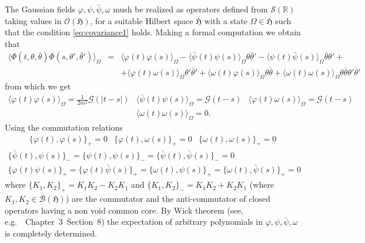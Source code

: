 \documentclass[a4paper,10pt]{article}
\begin{document}
The Gaussian fields $\varphi, \psi, \bar{\psi}, \omega$ mush be realized as
operators defined from $\mathcal{S} (\mathbb{R})$ taking values in
$\mathcal{O} (\mathfrak{H})$, for a suitable Hilbert space $\mathfrak{H}$ with
a state $\Omega \in \mathfrak{H}$ such that the condition
{\eqref{eq:covariance1}} holds. Making a formal computation we obtain that
\begin{eqnarray}
  \langle \Phi (t, \theta, \bar{\theta}) \Phi (s, \theta', \bar{\theta}')
  \rangle_{\Omega} & = & \langle \varphi (t) \varphi (s) \rangle_{\Omega} -
  \langle \bar{\psi} (t) \psi (s) \rangle_{\Omega} \theta \bar{\theta}' -
  \langle \psi (t) \bar{\psi} (s) \rangle_{\Omega} \bar{\theta} \theta' +
  \nonumber\\
  &  & + \langle \varphi (t) \omega (s) \rangle_{\Omega} \theta'
  \bar{\theta}' + \langle \omega (t) \varphi (s) \rangle_{\Omega} \theta
  \bar{\theta} + \langle \omega (t) \omega (s) \rangle_{\Omega} \theta
  \bar{\theta} \theta' \bar{\theta}' \nonumber
\end{eqnarray}
from which we get
\begin{equation}
  \begin{array}{ccc}
    \langle \varphi (t) \varphi (s) \rangle_{\Omega} = \frac{1}{2 m^2}
    \mathcal{G} (| t - s |) & \langle \bar{\psi} (t) \psi (s) \rangle_{\Omega}
    = \mathcal{G} (t - s) & \langle \varphi (t) \omega (s) \rangle_{\Omega} =
    \mathcal{G} (t - s)\\
    & \langle \omega (t) \omega (s) \rangle_{\Omega} = 0. & 
  \end{array} \label{eq:covariance2}
\end{equation}
Using the commutation relations
\begin{equation}
  \begin{array}{lcl}
    \{ \varphi (t), \varphi (s) \}_+ = 0 & \{ \varphi (t), \omega (s) \}_+ = 0
    & \{ \omega (t), \omega (s) \}_+ = 0
  \end{array} \label{eq:commutator1}
\end{equation}
\begin{equation}
  \begin{array}{c}
    \{ \bar{\psi} (t), \psi (s) \}_- = \{ \psi (t), \psi (s) \}_- = \{
    \bar{\psi} (t), \bar{\psi} (s) \}_- = 0\\
    \{ \varphi (t) \psi (s) \}_+ = \{ \varphi (t) \bar{\psi} (s) \}_+ = \{
    \omega (t), \psi (s) \}_+ = \{ \omega (t), \bar{\psi} (s) \}_+ = 0
  \end{array} \label{eq:commutator2}
\end{equation}
where $\{ K_1, K_2 \}_+ = K_1 K_2 - K_2 K_1$ and $\{ K_1, K_2 \}_- = K_1 K_2 +
K_2 K_1$ (where $K_1, K_2 \in \mathcal{B} (\mathfrak{H})$) are the commutator
and the anti-commutator of closed operators having a non void common core. By
Wick theorem (see, e.g.~{\cite{Fetter2012}}~Chapter~3~Section~8) the
expectation of arbitrary polynomials in $\varphi, \psi, \bar{\psi}, \omega$ is
completely determined.
\end{document}
